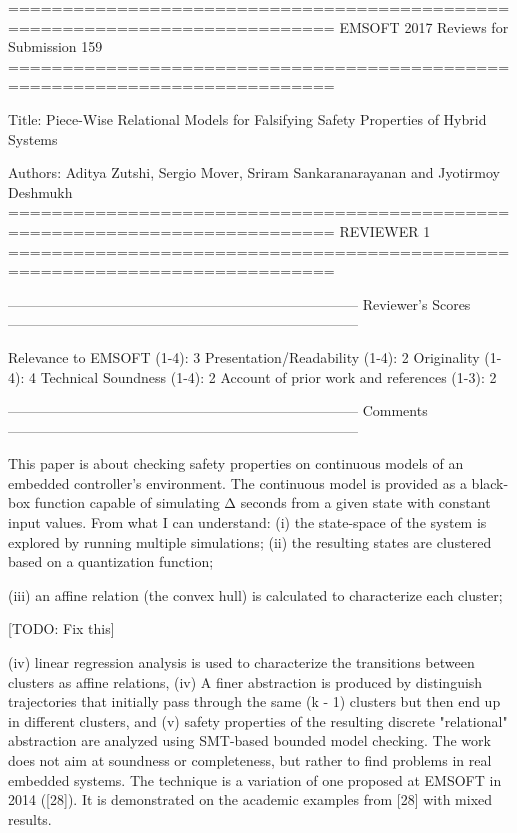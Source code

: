 ============================================================================
EMSOFT 2017 Reviews for Submission 159
============================================================================

Title: Piece-Wise Relational Models for Falsifying Safety Properties of Hybrid Systems

Authors: Aditya Zutshi, Sergio Mover, Sriram Sankaranarayanan and Jyotirmoy Deshmukh
============================================================================
                            REVIEWER 1
============================================================================


---------------------------------------------------------------------------
Reviewer's Scores
---------------------------------------------------------------------------

               Relevance to EMSOFT (1-4): 3
          Presentation/Readability (1-4): 2
                       Originality (1-4): 4
               Technical Soundness (1-4): 2
Account of prior work and references (1-3): 2


---------------------------------------------------------------------------
Comments
---------------------------------------------------------------------------

This paper is about checking safety properties on continuous models of an
embedded controller's environment. The continuous model is provided as a
black-box function capable of simulating Δ seconds from a given state with
constant input values. From what I can understand: (i) the state-space of
the system is explored by running multiple simulations; (ii) the resulting
states are clustered based on a quantization function; 

(iii) an affine
relation (the convex hull) is calculated to characterize each cluster; 

[TODO: Fix this]

(iv)
linear regression analysis is used to characterize the transitions between
clusters as affine relations, (iv) A finer abstraction is produced by
distinguish trajectories that initially pass through the same (k - 1)
clusters but then end up in different clusters, and (v) safety properties of
the resulting discrete "relational" abstraction are analyzed using SMT-based
bounded model checking. The work does not aim at soundness or completeness,
but rather to find problems in real embedded systems. The technique is a
variation of one proposed at EMSOFT in 2014 ([28]). It is demonstrated on
the academic examples from [28] with mixed results.

